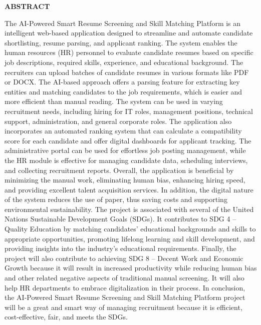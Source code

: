 \documentclass[12pt,a4paper]{report}
\begin{document}

\clearpage
\thispagestyle{empty}

\begin{center}
    {\bfseries\large ABSTRACT}
\end{center}

\vspace{1cm}


The AI-Powered Smart Resume Screening and Skill Matching Platform is an intelligent web-based application designed to streamline and automate candidate shortlisting, resume parsing, and applicant ranking. The system enables the human resources (HR) personnel to evaluate candidate resumes based on specific job descriptions, required skills, experience, and educational background. The recruiters can upload batches of candidate resumes in various formats like PDF or DOCX. The AI-based approach offers a parsing feature for extracting key entities and matching candidates to the job requirements, which is easier and more efficient than manual reading. The system can be used in varying recruitment needs, including hiring for IT roles, management positions, technical support, administration, and general corporate roles.
The application also incorporates an automated ranking system that can calculate a compatibility score for each candidate and offer digital dashboards for applicant tracking. The administrative portal can be used for effortless job posting management, while the HR module is effective for managing candidate data, scheduling interviews, and collecting recruitment reports. Overall, the application is beneficial by minimizing the manual work, eliminating human bias, enhancing hiring speed, and providing excellent talent acquisition services. In addition, the digital nature of the system reduces the use of paper, thus saving costs and supporting environmental sustainability.
The project is associated with several of the United Nations Sustainable Development Goals (SDGs). It contributes to SDG 4 – Quality Education by matching candidates' educational backgrounds and skills to appropriate opportunities, promoting lifelong learning and skill development, and providing insights into the industry's educational requirements. Finally, the project will also contribute to achieving SDG 8 – Decent Work and Economic Growth because it will result in increased productivity while reducing human bias and other related negative aspects of traditional manual screening. It will also help HR departments to embrace digitalization in their process.
In conclusion, the AI-Powered Smart Resume Screening and Skill Matching Platform project will be a great and smart way of managing recruitment because it is efficient, cost-effective, fair, and meets the SDGs.
\end{document}
